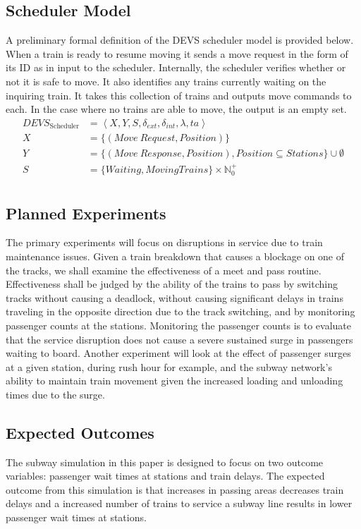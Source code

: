\subsection{Scheduler Model}
A preliminary formal definition of the DEVS scheduler model is provided below. When a train is ready to resume moving it sends a move request in the form of its ID as in input to the scheduler.  Internally, the scheduler verifies whether or not it is safe to move.  It also identifies any trains currently waiting on the inquiring train.  It takes this collection of trains and outputs move commands to each.  In the case where no trains are able to move, the output is an empty set.
\begin{align*} DEVS_{\textrm{Scheduler}} &= \left<X,Y,S,\delta_{ext},\delta_{int},\lambda,ta\right> \\
X &= \lbrace (Move\ Request,Position)\rbrace \\
Y &= \lbrace(Move\ Response,Position),Position\subseteq Stations\rbrace \cup\emptyset \\
S &= \lbrace Waiting, Moving Trains\rbrace\times \mathbb{N}_0^+ \\
\end{align*}

\subsection{Planned Experiments}
The primary experiments will focus on disruptions in service due to train maintenance issues.  Given a train breakdown that causes a blockage on one of the tracks, we shall examine the effectiveness of a meet and pass routine.  Effectiveness shall be judged by the ability of the trains to pass by switching tracks without causing a deadlock, without causing significant delays in trains traveling in the opposite direction due to the track switching, and by monitoring passenger counts at the stations.  Monitoring the passenger counts is to evaluate that the service disruption does not cause a severe sustained surge in passengers waiting to board.  Another experiment will look at the effect of passenger surges at a given station, during rush hour for example, and the subway network's ability to maintain train movement given the increased loading and unloading times due to the surge.

\subsection{Expected Outcomes}

The subway simulation in this paper is designed to focus on two outcome variables: passenger wait times at stations and train delays. The expected outcome from this simulation is that increases in passing areas decreases train delays and a increased number of trains to service a subway line results in lower passenger wait times at stations.